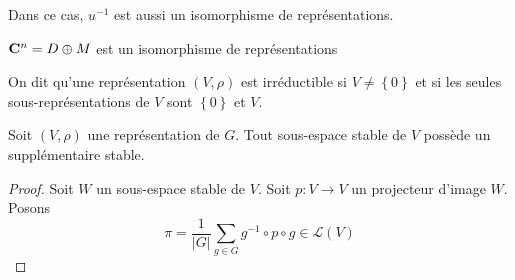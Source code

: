 \begin{rem}
Dans ce cas, $u^{-1}$ est aussi un isomorphisme de représentations.
\end{rem}

\begin{ex}
$ \mathbf C^n=D\oplus M$ est un isomorphisme de représentations
\end{ex}

\begin{dfn}
    On dit qu'une représentation $(V, \rho)$ est irréductible si $V\neq \left\{ 0 \right\} $ et si les seules sous-représentations de $V$ sont  $\left\{ 0 \right\} $ et $V$.
\end{dfn}

\begin{thm}
    Soit $(V, \rho)$ une représentation de  $G$. Tout sous-espace stable de  $V$ possède un supplémentaire stable.
\end{thm}

\begin{proof}
Soit $W$ un sous-espace stable de $V$. Soit $p : V \longrightarrow  V$ un projecteur d'image $W$. Posons \[
    \pi=\frac1{|G|}\sum_{g \in  G}g^{-1}\circ p \circ g \in  \mathcal  L(V)
\] 
\end{proof}

